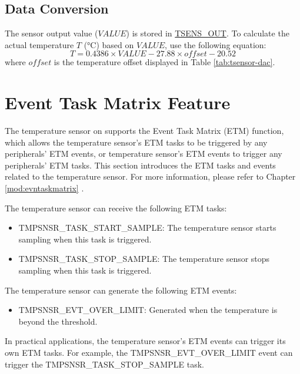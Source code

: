 \documentclass[main\_\_EN.tex]{subfiles}
\begin{document}
\subsection{Data Conversion}

The sensor output value (\(VALUE\)) is stored in \hyperref[fielddesc:TSENSOUT]{TSENS\_OUT}. To calculate the actual temperature \(T\) (°C) based on \(VALUE\), use the following equation:
\[
        T = 0.4386 \times VALUE - 27.88 \times offset - 20.52
\]
where \(offset\) is the temperature offset displayed in Table \ref{tab:tsensor-dac}.


\section{Event Task Matrix Feature}
\label{sec:sensor-etm-func}

The temperature sensor on \chipname{} supports the Event Task Matrix (ETM) function, which allows the temperature sensor's ETM tasks to be triggered by any peripherals' ETM events, or temperature sensor's ETM events to trigger any peripherals' ETM tasks. This section introduces the ETM tasks and events related to the temperature sensor. For more information, please refer to Chapter \ref{mod:evntaskmatrix} .

The temperature sensor can receive the following ETM tasks:

\begin{itemize}
    \item TMPSNSR\_TASK\_START\_SAMPLE: The temperature sensor starts sampling when this task is triggered.
    \item TMPSNSR\_TASK\_STOP\_SAMPLE: The temperature sensor stops sampling when this task is triggered.
\end{itemize}

The temperature sensor can generate the following ETM events:

\begin{itemize}
    \item TMPSNSR\_EVT\_OVER\_LIMIT: Generated when the temperature is beyond the threshold.
\end{itemize}

In practical applications, the temperature sensor's ETM events can trigger its own ETM tasks. For example, the TMPSNSR\_EVT\_OVER\_LIMIT event can trigger the TMPSNSR\_TASK\_STOP\_SAMPLE task.
\end{document}

